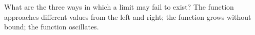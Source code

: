 {What are the three ways in which a limit may fail to exist?}
{The function approaches different values from the left and right; the function grows without bound; the function oscillates.}
